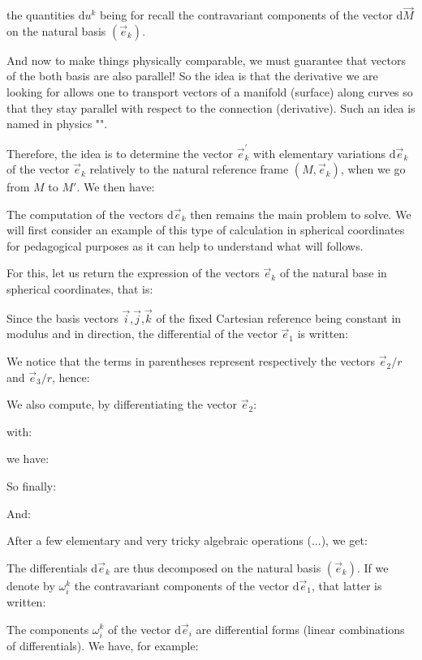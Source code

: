 	the quantities $\mathrm{d}u^k$ being for recall the contravariant components of the vector $\mathrm{d}\vec{M}$ on the natural basis $(\vec{e}_k)$.
	
	And now to make things physically comparable, we must guarantee that vectors of the both basis are also parallel! So the idea is that the derivative we are looking for allows one to transport vectors of a manifold (surface) along curves so that they stay parallel with respect to the connection (derivative). Such an idea is named in physics "".

	Therefore, the idea is to determine the vector $\vec{e}_k^{\prime}$ with elementary variations $\mathrm{d}\vec{e}_k$ of the vector $\vec{e}_k$ relatively to the natural reference frame $(M,\vec{e}_k)$, when we go from $M$ to $M'$. We then have:
	
	The computation of the vectors $\mathrm{d}\vec{e}_k$ then remains the main problem to solve. We will first consider an example of this type of calculation in spherical coordinates for pedagogical purposes as it can help to understand what will follows.

For this, let us return the expression of the vectors $\vec{e}_k$ of the natural base in spherical coordinates, that is:
	
	Since the basis vectors $\vec{i}$,$\vec{j}$,$\vec{k}$ of the fixed Cartesian reference being constant in modulus and in direction, the differential of the vector $\vec{e}_1$ is written:
	
	We notice that the terms in parentheses represent respectively the vectors $\vec{e}_2/r$ and $\vec{e}_3/r$, hence:
	
	We also compute, by differentiating the vector $\vec{e}_2$:
	
	with:
	
	we have:
	
	So finally:
	
	And:
	
	After a few elementary and very tricky algebraic operations (...), we get:
	
	The differentials $\mathrm{d}\vec{e}_k$ are thus decomposed on the natural basis $(\vec{e}_k)$. If we denote by $\omega_i^k$ the contravariant components of the vector $\mathrm{d}\vec{e}_1$, that latter is written:
	
	The components $\omega_i^k$ of the vector $\mathrm{d}\vec{e}_i$ are differential forms (linear combinations of differentials). We have, for example:
	
